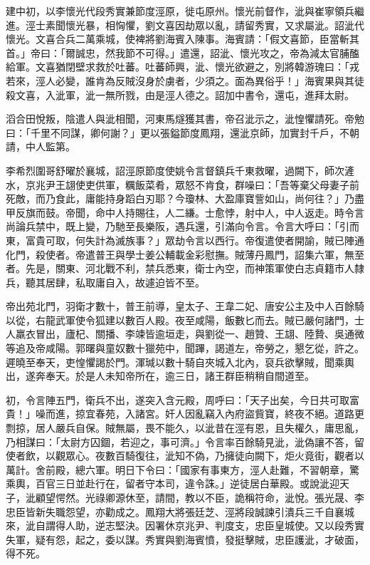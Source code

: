 \begin{pinyinscope}
 建中初，以李懷光代段秀實兼節度涇原，徙屯原州。懷光前督作，泚與崔寧領兵繼進。涇士素聞懷光暴，相恟懼，劉文喜因劫眾以亂，請留秀實，又求屬泚。詔泚代懷光。文喜合兵二萬乘城，使裨將劉海賓入陳事。海賓請：「假文喜節，臣當斬其首。」帝曰：「爾誠忠，然我節不可得。」遣還，詔泚、懷光攻之，帝為減太官脯醢給軍。文喜猶閉壁求救於吐蕃。吐蕃師興，泚、懷光欲避之，別將韓游瑰曰：「戎若來，涇人必變，誰肯為反賊沒身於虜者，少須之。面為異俗乎！」海賓果與其徒殺文喜，入泚軍，泚一無所戮，由是涇人德之。詔加中書令，還屯，進拜太尉。



 滔合田悅叛，陰遣人與泚相聞，河東馬燧獲其書，帝召泚示之，泚惶懼請死。帝勉曰：「千里不同謀，卿何謝？」更以張鎰節度鳳翔，還泚京師，加實封千戶，不朝請，中人監第。



 李希烈圍哥舒曜於襄城，詔涇原節度使姚令言督鎮兵千東救曜，過闕下，師次滻水，京兆尹王翃使吏供軍，糲飯菜肴，眾怒不肯食，群噪曰：「吾等棄父母妻子前死敵，而乃食此，庸能持身蹈白刃耶？今瓊林、大盈庫寶訾如山，尚何往？」乃盡甲反旗而鼓。帝聞，命中人持賜往，人二縑。士愈悖，射中人，中人返走。時令言尚論兵禁中，既上變，乃馳至長樂阪，遇兵還，引滿向令言。令言大呼曰：「引而東，富貴可取，何失計為滅族事？」眾劫令言以西行。帝復遣使者開諭，賊已陣通化門，殺使者。帝遣普王與學士姜公輔載金彩慰撫。賊薄丹鳳門，詔集六軍，無至者。先是，關東、河北戰不利，禁兵悉東，衛士內空，而神策軍使白志貞籍市人隸兵，聽其居肆，私取庸自入，故遽迫皆不至。



 帝出苑北門，羽衛才數十，普王前導，皇太子、王韋二妃、唐安公主及中人百餘騎以從，右龍武軍使令狐建以數百人殿。夜至咸陽，飯數匕而去。賊已嚴何諸門，士人羸衣冒出，廬杞、關播、李竦皆逾垣走，與劉從一、趙贊、王翃、陸贄、吳通微等追及帝咸陽。郭曙與童奴數十獵苑中，聞蹕，謁道左，帝勞之，懇乞從，許之。遲曉至奉天，吏惶懼謁於門。渾瑊以數十騎自夾城入北內，裒兵欲擊賊，聞乘輿出，遂奔奉天。於是人未知帝所在，逾三日，諸王群臣稍稍自間道至。



 初，令言陣五門，衛兵不出，遂突入含元殿，周呼曰：「天子出矣，今日共可取富貴！」噪而進，掠宜春苑，入諸宮。奸人因亂竊入內府盜貲寶，終夜不絕。道路更剽掠，居人嚴兵自保。賊無屬，畏不能久，以泚昔在涇有恩，且失權久，庸思亂，乃相謀曰：「太尉方囚錮，若迎之，事可濟。」令言率百餘騎見泚，泚偽讓不答，留使者飲，以觀眾心。夜數百騎復往，泚知不偽，乃擁徒向闕下，炬火竟街，觀者以萬計。舍前殿，總六軍。明日下令曰：「國家有事東方，涇人赴難，不習朝章，驚乘輿，百官三日並赴行在，留者守本司，違令誅。」逆徒居白華殿。或說泚迎天子，泚顧望愕然。光祿卿源休至，請間，教以不臣，詭稱符命，泚悅。張光晟、李忠臣皆新失職怨望，亦勸成之。鳳翔大將張廷芝、涇將段誠諫引潰兵三千自襄城來，泚自謂得人助，逆志堅決。因署休京兆尹、判度支，忠臣皇城使。又以段秀實失軍，疑有怨，起之，委以謀。秀實與劉海賓憤，發挺擊賊，忠臣護泚，才破面，得不死。




\end{pinyinscope}
